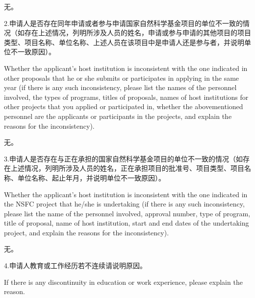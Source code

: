 \documentclass[12pt,UTF8,AutoFakeBold=4,a4paper]{ctexart}
\begin{document}
\bigskip

无。

\bigskip

{\sihao \color{MsBlue} \kaishu 2.申请人是否存在同年申请或者参与申请国家自然科学基金项目的单位不一致的情况（如存在上述情况，列明所涉及人员的姓名，申请或参与申请的其他项目的项目类型、项目名称、单位名称、上述人员在该项目中是申请人还是参与者，并说明单位不一致原因）。}

\bigskip

{\color{MsBlue} \xiaosihao {} 
Whether the applicant's host institution is inconsistent with the one indicated in other proposals that he or she submits or participates in applying in the same year (if there is any such inconsistency, please list the names of the personnel involved, the types of programs, titles of proposals, names of host institutions for other projects that you applied or participated in, whether the abovementioned personnel are the applicants or participants in the projects, and explain the reasons for the inconsistency).}

\bigskip

无。

\bigskip

{\sihao \color{MsBlue} \kaishu 3.申请人是否存在与正在承担的国家自然科学基金项目的单位不一致的情况（如存在上述情况，列明所涉及人员的姓名，正在承担项目的批准号、项目类型、项目名称、单位名称、起止年月，并说明单位不一致原因）。}

\bigskip

{\color{MsBlue} \xiaosihao {} 
Whether the applicant's host institution is inconsistent with the one indicated in the NSFC project that he/she is undertaking (if there is any such inconsistency, please list the name of the personnel involved, approval number, type of program, title of proposal, name of host institution, start and end dates of the undertaking project, and explain the reasons for the inconsistency).}

\bigskip

无。

\bigskip

{\sihao \color{MsBlue} \kaishu 4.申请人教育或工作经历若不连续请说明原因。}

\bigskip

{\color{MsBlue} \xiaosihao {} 
If there is any discontinuity in education or work experience, please explain the reason.}

\bigskip
\end{document}
